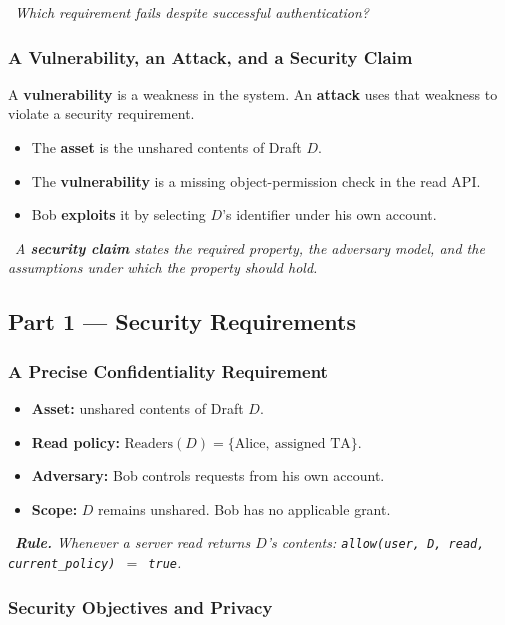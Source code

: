 \documentclass[hidelinks]{article}
\newcommand{\callout}[1]{\par\smallskip\noindent{\color{capri}$\blacktriangleright$}\ \textit{#1}\par\smallskip}
\begin{document}
\callout{Which requirement fails despite successful authentication?}

\subsubsection{A Vulnerability, an Attack, and a Security Claim}

A \textbf{vulnerability} is a weakness in the system. An \textbf{attack} uses that weakness to violate a security requirement.
\begin{itemize}
    \item The \textbf{asset} is the unshared contents of Draft $D$.
    \item The \textbf{vulnerability} is a missing object-permission check in the read API.
    \item Bob \textbf{exploits} it by selecting $D$'s identifier under his own account.
\end{itemize}

\callout{A \textbf{security claim} states the required property, the adversary model, and the assumptions under which the property should hold.}

\subsection{Part 1 --- Security Requirements}

\subsubsection{A Precise Confidentiality Requirement}

\begin{itemize}
    \item \textbf{Asset:} unshared contents of Draft $D$.
    \item \textbf{Read policy:} $\text{Readers}(D) = \{\text{Alice},\ \text{assigned TA}\}$.
    \item \textbf{Adversary:} Bob controls requests from his own account.
    \item \textbf{Scope:} $D$ remains unshared. Bob has no applicable grant.
\end{itemize}

\callout{\textbf{Rule.} Whenever a server read returns $D$'s contents: \texttt{allow(user, D, read, current\_policy)}~$=$~\texttt{true}.}

\subsubsection{Security Objectives and Privacy}
\end{document}
